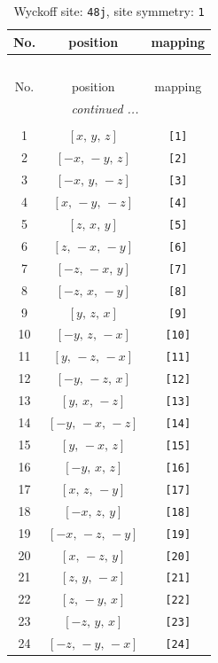 \documentclass[fleqn,8pt]{jsarticle}
\begin{document}
\begin{longtable}{ccc}
\caption{Wyckoff site: {\tt 48j}, site symmetry: {\tt 1}}
 \\
 \hline \hline
No. & position & mapping \\ \hline \endfirsthead

\multicolumn{2}{l}{\tablename\ \thetable{}} \\
 \hline \hline
No. & position & mapping \\ \hline \endhead

 \hline \hline
\multicolumn{2}{r}{\footnotesize\it continued ...} \\ \endfoot

 \hline \hline
\multicolumn{2}{r}{} \\ \endlastfoot

1 & $\left[ x,\, y,\, z \right]$ & {\tt [1]} \\ \hline
2 & $\left[ - x,\, - y,\, z \right]$ & {\tt [2]} \\ \hline
3 & $\left[ - x,\, y,\, - z \right]$ & {\tt [3]} \\ \hline
4 & $\left[ x,\, - y,\, - z \right]$ & {\tt [4]} \\ \hline
5 & $\left[ z,\, x,\, y \right]$ & {\tt [5]} \\ \hline
6 & $\left[ z,\, - x,\, - y \right]$ & {\tt [6]} \\ \hline
7 & $\left[ - z,\, - x,\, y \right]$ & {\tt [7]} \\ \hline
8 & $\left[ - z,\, x,\, - y \right]$ & {\tt [8]} \\ \hline
9 & $\left[ y,\, z,\, x \right]$ & {\tt [9]} \\ \hline
10 & $\left[ - y,\, z,\, - x \right]$ & {\tt [10]} \\ \hline
11 & $\left[ y,\, - z,\, - x \right]$ & {\tt [11]} \\ \hline
12 & $\left[ - y,\, - z,\, x \right]$ & {\tt [12]} \\ \hline
13 & $\left[ y,\, x,\, - z \right]$ & {\tt [13]} \\ \hline
14 & $\left[ - y,\, - x,\, - z \right]$ & {\tt [14]} \\ \hline
15 & $\left[ y,\, - x,\, z \right]$ & {\tt [15]} \\ \hline
16 & $\left[ - y,\, x,\, z \right]$ & {\tt [16]} \\ \hline
17 & $\left[ x,\, z,\, - y \right]$ & {\tt [17]} \\ \hline
18 & $\left[ - x,\, z,\, y \right]$ & {\tt [18]} \\ \hline
19 & $\left[ - x,\, - z,\, - y \right]$ & {\tt [19]} \\ \hline
20 & $\left[ x,\, - z,\, y \right]$ & {\tt [20]} \\ \hline
21 & $\left[ z,\, y,\, - x \right]$ & {\tt [21]} \\ \hline
22 & $\left[ z,\, - y,\, x \right]$ & {\tt [22]} \\ \hline
23 & $\left[ - z,\, y,\, x \right]$ & {\tt [23]} \\ \hline
24 & $\left[ - z,\, - y,\, - x \right]$ & {\tt [24]} \\
\end{longtable}
\end{document}
